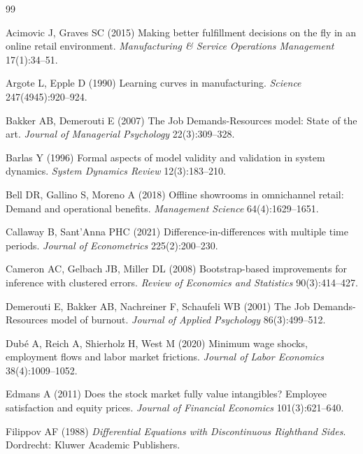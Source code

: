\documentclass[msom,dblanonrev]{informs4}
\def\bibsep{\smallskipamount}%
\begin{document}
{\footnotesize\setlength{\bibsep}{1pt}
\begin{thebibliography}{99}

Acimovic J, Graves SC (2015) Making better fulfillment decisions on the fly in an online retail environment.
\textit{Manufacturing \& Service Operations Management} 17(1):34--51.

Argote L, Epple D (1990) Learning curves in manufacturing.
\textit{Science} 247(4945):920--924.

Bakker AB, Demerouti E (2007) The Job Demands-Resources model: State of the art.
\textit{Journal of Managerial Psychology} 22(3):309--328.

Barlas Y (1996) Formal aspects of model validity and validation in system dynamics.
\textit{System Dynamics Review} 12(3):183--210.

Bell DR, Gallino S, Moreno A (2018) Offline showrooms in omnichannel retail: Demand and operational benefits.
\textit{Management Science} 64(4):1629--1651.

Callaway B, Sant'Anna PHC (2021) Difference-in-differences with multiple time periods.
\textit{Journal of Econometrics} 225(2):200--230.

Cameron AC, Gelbach JB, Miller DL (2008) Bootstrap-based improvements for inference with clustered errors.
\textit{Review of Economics and Statistics} 90(3):414--427.

Demerouti E, Bakker AB, Nachreiner F, Schaufeli WB (2001) The Job Demands-Resources model of burnout.
\textit{Journal of Applied Psychology} 86(3):499--512.

Dub{\'{e}} A, Reich A, Shierholz H, West M (2020) Minimum wage shocks, employment flows and labor market frictions.
\textit{Journal of Labor Economics} 38(4):1009--1052.

Edmans A (2011) Does the stock market fully value intangibles? Employee satisfaction and equity prices.
\textit{Journal of Financial Economics} 101(3):621--640.

Filippov AF (1988) \textit{Differential Equations with Discontinuous Righthand Sides}.
Dordrecht: Kluwer Academic Publishers.


\end{thebibliography}}
\end{document}
